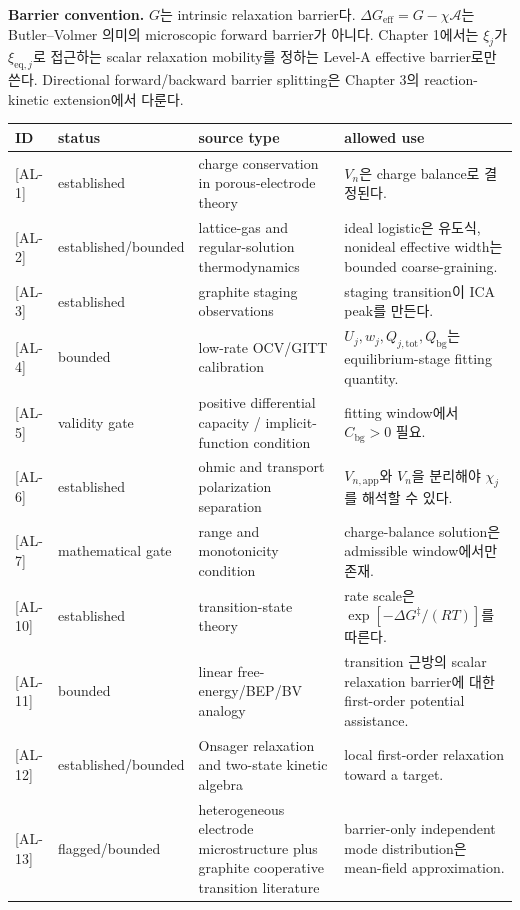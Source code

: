 \documentclass[11pt,a4paper]{article}
\newcommand{\eff}{\mathrm{eff}}
\newcommand{\eq}{\mathrm{eq}}
\newcommand{\app}{\mathrm{app}}
\newcommand{\bg}{\mathrm{bg}}
\newcommand{\tot}{\mathrm{tot}}
\newcommand{\AL}[1]{\textsf{[AL-#1]}}
\begin{document}
\textbf{Barrier convention.} $G$는 intrinsic relaxation barrier다. $\Delta G_{\eff}=G-\chi\mathcal A$는 Butler--Volmer 의미의
microscopic forward barrier가 아니다. Chapter 1에서는 $\xi_j$가 $\xi_{\eq,j}$로 접근하는 scalar relaxation mobility를 정하는
Level-A effective barrier로만 쓴다. Directional forward/backward barrier splitting은 Chapter 3의 reaction-kinetic extension에서
다룬다.

\begin{longtable}{p{} p{} p{} p{}}
\toprule ID & status & source type & allowed use \\ \midrule \endhead
\AL{1} & established & charge conservation in porous-electrode theory \cite{doyle1993,newman} & $V_n$은 charge balance로 결정된다. \\
\AL{2} & established/bounded & lattice-gas and regular-solution thermodynamics \cite{mckinnon1983,bazant2013} & ideal logistic은 유도식, nonideal effective width는 bounded coarse-graining. \\
\AL{3} & established & graphite staging observations \cite{dahn1991,ohzuku1993,funabiki1999ea,funabiki1999jes} & staging transition이 ICA peak를 만든다. \\
\AL{4} & bounded & low-rate OCV/GITT calibration & $U_j,w_j,Q_{j,\tot},Q_{\bg}$는 equilibrium-stage fitting quantity. \\
\AL{5} & validity gate & positive differential capacity / implicit-function condition \cite{newman,bazant2013} & fitting window에서 $C_{\bg}>0$ 필요. \\
\AL{6} & established & ohmic and transport polarization separation \cite{newman,bardfaulkner} & $V_{n,\app}$와 $V_n$을 분리해야 $\chi_j$를 해석할 수 있다. \\
\AL{7} & mathematical gate & range and monotonicity condition & charge-balance solution은 admissible window에서만 존재. \\
\AL{10} & established & transition-state theory \cite{eyring1935} & rate scale은 $\exp[-\Delta G^\ddagger/(RT)]$를 따른다. \\
\AL{11} & bounded & linear free-energy/BEP/BV analogy \cite{evanspolanyi1938,bardfaulkner,bazant2013} & transition 근방의 scalar relaxation barrier에 대한 first-order potential assistance. \\
\AL{12} & established/bounded & Onsager relaxation and two-state kinetic algebra \cite{onsager1931,degrootmazur1962} & local first-order relaxation toward a target. \\
\AL{13} & flagged/bounded & heterogeneous electrode microstructure plus graphite cooperative transition literature & barrier-only independent mode distribution은 mean-field approximation. \\

\end{longtable}
\end{document}
